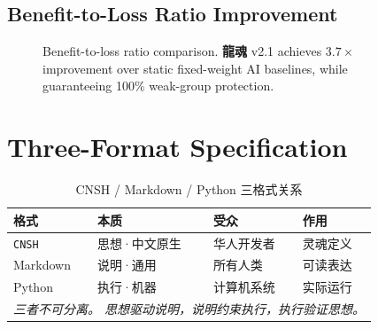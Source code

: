 \documentclass[conference]{IEEEtran}
\newcommand{\LH}{\textcolor{dragonRed}{\textbf{龍魂}}}
\newcommand{\CNSH}{\texttt{\textcolor{dnaBlue}{CNSH}}}
\begin{document}
\subsection{Benefit-to-Loss Ratio Improvement}

\begin{figure}[t]
\centering
{}
\caption{Benefit-to-loss ratio comparison.
  \LH{} v2.1 achieves $3.7\times$ improvement over
  static fixed-weight AI baselines,
  while guaranteeing 100\% weak-group protection.}
\label{fig:eval-bar}
\end{figure}

\section{Three-Format Specification}
\label{sec:formats}

\begin{table}[t]
\centering
\caption{CNSH / Markdown / Python 三格式关系}
\label{tab:formats}
\renewcommand{\arraystretch}{1.2}
\begin{tabular}{llll}
\toprule
\textbf{格式} & \textbf{本质}
  & \textbf{受众} & \textbf{作用} \\
\midrule
\CNSH{} & 思想·中文原生
  & 华人开发者 & 灵魂定义 \\
Markdown & 说明·通用
  & 所有人类 & 可读表达 \\
Python & 执行·机器
  & 计算机系统 & 实际运行 \\
\midrule
\multicolumn{4}{l}{%
  \textit{三者不可分离。
    思想驱动说明，说明约束执行，执行验证思想。}} \\
\bottomrule
\end{tabular}
\end{table}
\end{document}
